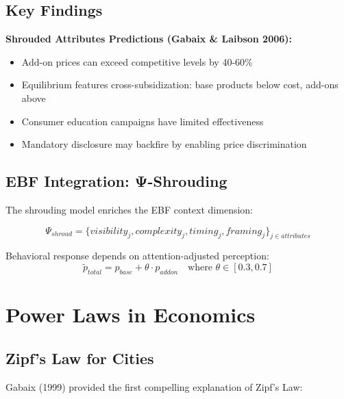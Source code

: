 \subsection{Key Findings}

\begin{tcolorbox}[colback=blue!5!white, colframe=blue!75!black]
\textbf{Shrouded Attributes Predictions (Gabaix \& Laibson 2006):}
\begin{itemize}
    \item Add-on prices can exceed competitive levels by 40-60\%
    \item Equilibrium features cross-subsidization: base products below cost, add-ons above
    \item Consumer education campaigns have limited effectiveness
    \item Mandatory disclosure may backfire by enabling price discrimination
\end{itemize}
\end{tcolorbox}

\subsection{EBF Integration: Ψ-Shrouding}

The shrouding model enriches the EBF context dimension:

\begin{equation}
\Psi_{shroud} = \{visibility_j, complexity_j, timing_j, framing_j\}_{j \in attributes}
\end{equation}

Behavioral response depends on attention-adjusted perception:
\begin{equation}
\tilde{p}_{total} = p_{base} + \theta \cdot p_{addon} \quad \text{where } \theta \in [0.3, 0.7]
\end{equation}

\section{Power Laws in Economics}

\subsection{Zipf's Law for Cities}

Gabaix (1999) provided the first compelling explanation of Zipf's Law:

